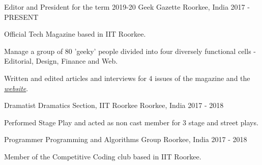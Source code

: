 

\begin{cventries}

  \cventry
    {Editor and President for the term 2019-20} %
    {Geek Gazette} %
    {Roorkee, India} %
    {2017 - PRESENT} %
    {
      \begin{cvitems} %
        \item {Official Tech Magazine based in IIT Roorkee.}
        \item {Manage a group of 80 'geeky' people divided into four diversely functional cells - Editorial, Design, Finance and Web.}
        \item {Written and edited articles and interviews for 4 issues of the magazine and the \emph{\href{https://geekgazette.org/}{website}}.}
      \end{cvitems}
    }

  \cventry
    {Dramatist} %
    {Dramatics Section, IIT Roorkee} %
    {Roorkee, India} %
    {2017 - 2018} %
    {
      \begin{cvitems} %
        \item {Performed Stage Play and acted as non cast member for 3 stage and street plays.}
      \end{cvitems}
    }
    
  \cventry
    {Programmer} %
    {Programming and Algorithms Group} %
    {Roorkee, India} %
    {2017 - 2018} %
    {
      \begin{cvitems} %
        \item {Member of the Competitive Coding club based in IIT Roorkee.}
      \end{cvitems}
    }

\end{cventries}

